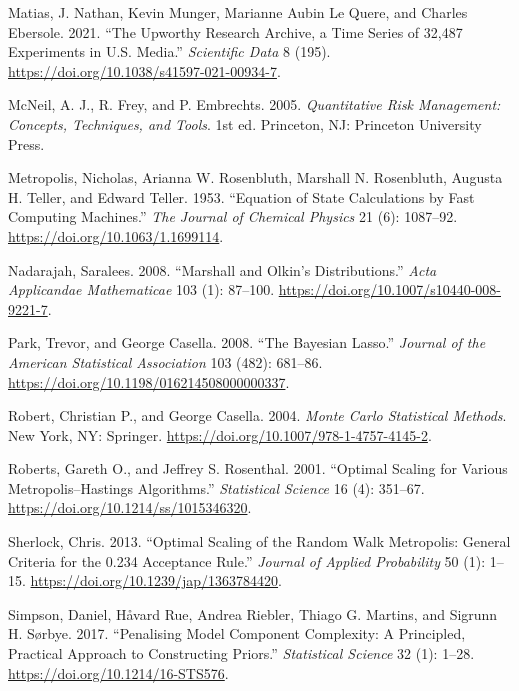 \documentclass[
  11pt,
  letterpaper,
]{scrbook}
\newlength{\cslhangindent}
\newenvironment{CSLReferences}[2] %
 {\begin{list}{}{%
  \setlength{\itemindent}{0pt}
  \setlength{\leftmargin}{0pt}
  \setlength{\parsep}{0pt}
  \ifodd #1
   \setlength{\leftmargin}{\cslhangindent}
   \setlength{\itemindent}{-1\cslhangindent}
  \fi
  \setlength{\itemsep}{#2\baselineskip}}}
 {\end{list}}
\theoremstyle{definition}
\theoremstyle{definition}
\theoremstyle{definition}
\theoremstyle{plain}
\theoremstyle{plain}
\theoremstyle{remark}
\begin{document}
\begin{CSLReferences}{1}{0}
Matias, J. Nathan, Kevin Munger, Marianne Aubin Le Quere, and Charles
Ebersole. 2021. {``The {U}pworthy {R}esearch {A}rchive, a Time Series of
32,487 Experiments in {U.S.} Media.''} \emph{Scientific Data} 8 (195).
\url{https://doi.org/10.1038/s41597-021-00934-7}.

McNeil, A. J., R. Frey, and P. Embrechts. 2005. \emph{Quantitative Risk
Management: Concepts, Techniques, and Tools}. 1st ed. Princeton, NJ:
Princeton University Press.

Metropolis, Nicholas, Arianna W. Rosenbluth, Marshall N. Rosenbluth,
Augusta H. Teller, and Edward Teller. 1953. {``{Equation of State
Calculations by Fast Computing Machines}.''} \emph{The Journal of
Chemical Physics} 21 (6): 1087--92.
\url{https://doi.org/10.1063/1.1699114}.

Nadarajah, Saralees. 2008. {``{M}arshall and {O}lkin's Distributions.''}
\emph{Acta Applicandae Mathematicae} 103 (1): 87--100.
\url{https://doi.org/10.1007/s10440-008-9221-7}.

Park, Trevor, and George Casella. 2008. {``The {B}ayesian {L}asso.''}
\emph{Journal of the American Statistical Association} 103 (482):
681--86. \url{https://doi.org/10.1198/016214508000000337}.

Robert, Christian P., and George Casella. 2004. \emph{Monte {C}arlo
Statistical Methods}. New York, NY: Springer.
\url{https://doi.org/10.1007/978-1-4757-4145-2}.

Roberts, Gareth O., and Jeffrey S. Rosenthal. 2001. {``Optimal Scaling
for Various {M}etropolis--{H}astings Algorithms.''} \emph{Statistical
Science} 16 (4): 351--67. \url{https://doi.org/10.1214/ss/1015346320}.

Sherlock, Chris. 2013. {``Optimal Scaling of the Random Walk
{M}etropolis: General Criteria for the 0.234 Acceptance Rule.''}
\emph{Journal of Applied Probability} 50 (1): 1--15.
\url{https://doi.org/10.1239/jap/1363784420}.

Simpson, Daniel, Håvard Rue, Andrea Riebler, Thiago G. Martins, and
Sigrunn H. Sørbye. 2017. {``Penalising Model Component Complexity: A
Principled, Practical Approach to Constructing Priors.''}
\emph{Statistical Science} 32 (1): 1--28.
\url{https://doi.org/10.1214/16-STS576}.


\end{CSLReferences}
\end{document}
